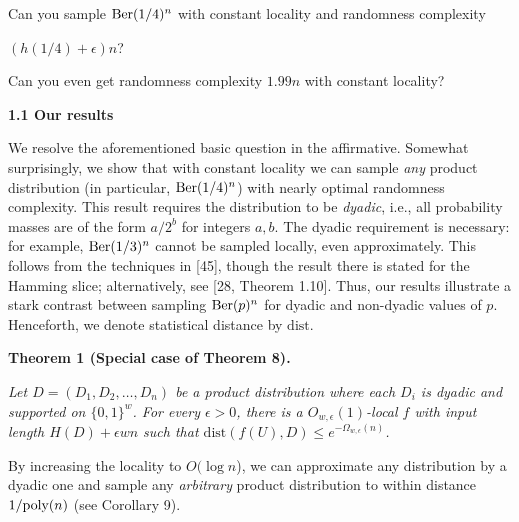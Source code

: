 Can you sample $\textnormal{Ber}(1/4)^{n}$ with constant locality and randomness complexity\par


$(h(1/4)+\epsilon)n$?\par


Can you even get randomness complexity $1.99n$ with constant locality?\par





\par\medskip\noindent\textbf{
1.1 Our results}\par




We resolve the aforementioned basic question in the affirmative. Somewhat surprisingly, we show that with constant locality we can sample \emph{any} product distribution (in particular, $\textnormal{Ber}(1/4)^{n}$) with nearly optimal randomness complexity. This result requires the distribution to be \emph{dyadic}, i.e., all probability masses are of the form $a/2^{b}$ for integers $a,b$. The dyadic requirement is necessary: for example, $\textnormal{Ber}(1/3)^{n}$ cannot be sampled locally, even approximately. This follows from the techniques in [45], though the result there is stated for the Hamming slice; alternatively, see [28, Theorem 1.10].
Thus, our results illustrate a stark contrast between sampling $\textnormal{Ber}(p)^{n}$ for dyadic and non-dyadic values of $p$.
Henceforth, we denote statistical distance by $\mathrm{dist}$.\par





\par\medskip\noindent\textbf{
\textbf{Theorem 1}\textbf{ }(Special case of Theorem 8)\textbf{.}
}\par



\emph{Let $D=(D_{1},D_{2},\ldots,D_{n})$ be a product distribution where each $D_{i}$ is dyadic and supported on $\{0,1\}^{w}$.
For every $\epsilon>0$, there is a $O_{w,\epsilon}(1)$-local $f$ with input length $H(D)+\epsilon wn$ such that $\mathrm{dist}(f(U),D)\leq e^{-\Omega_{w,\epsilon}(n)}$.}\par






By increasing the locality to $O(\log n$), we can approximate any distribution by a dyadic one and sample any \emph{arbitrary} product distribution to within distance $1/\textnormal{poly}(n)$ (see Corollary 9).\par




